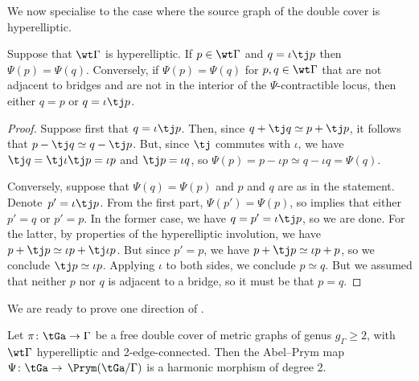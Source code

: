 We now specialise to the case where the source graph of the double cover is hyperelliptic.

\begin{lemma}\label{shapeOfFibres}
   Suppose that $\wt\Gamma$ is hyperelliptic. If $p\in\wt\Gamma$ and $q = \iota\tj p$ then $\Psi(p) = \Psi(q)$.   Conversely, if  $\Psi(p) = \Psi(q)$ for  $p,q\in\wt\Gamma$ 
   that are not adjacent to bridges and are not in the interior of the $\Psi$-contractible locus,
then either $q = p$ or $q = \iota\tj p$.
\end{lemma}
\begin{proof}
   
    Suppose first that  $q= \iota\tj p$. Then, since $q + \tj q\simeq p + \tj p$, it follows that $p - \tj q \simeq q - \tj p$.  But, since $\tj$ commutes with $\iota$, we have $\tj q = \tj\iota\tj p = \iota p$ and $\tj p = \iota q$, so $\Psi(p) = p-\iota p\simeq q-\iota q = \Psi(q)$. 
  
 
 Conversely, suppose that $\Psi(q) = \Psi(p)$ and $p$ and $q$ are as in the statement. Denote~$p' =\iota\tj p$. From the first part, $\Psi(p') = \Psi(p)$, so   implies that either $p' = q$ or $p' = p$.  In the former case, 
  we have $q = p' = \iota\tj p$, so 
 we are done.  For the latter, by properties of the hyperelliptic involution, we have $p + \tj p\simeq \iota p + \tj\iota p$. But since $p'=p$, we have $p + \tj p\simeq \iota p + p$, so we conclude $\tj p\simeq \iota p$. Applying $\iota$ to both sides, we conclude $p\simeq q$. But we assumed that neither  $p$ nor $q$  is adjacent to a bridge, so it must be that $p=q$. 
\end{proof}

We are ready to prove one direction of . 

\begin{theorem}\label{thm:ifHyperelliptic}
    Let $\pi\colon \tGa\to \Gamma$ be a  free double cover of metric graphs of genus $g_{\Gamma}\geq 2$, with $\wt\Gamma$ hyperelliptic and 2-edge-connected. Then the Abel--Prym map  $\Psi\colon \tGa\to \,\Prym(\tGa/\Gamma)$ is a harmonic morphism of degree 2.
\end{theorem}
 
